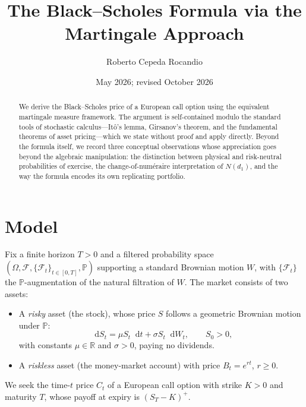 \documentclass[11pt,a4paper]{article}
\title{The Black--Scholes Formula via the Martingale Approach}
\author{Roberto Cepeda Rocandio}
\date{May 2026; revised October 2026}
\theoremstyle{plain}
\theoremstyle{definition}
\theoremstyle{remark}
\newcommand{\R}{\mathbb{R}}
\newcommand{\F}{\mathcal{F}}
\newcommand{\Prob}{\mathbb{P}}
\newcommand{\dd}{\mathop{}\!\mathrm{d}}
\begin{document}
\maketitle

\begin{abstract}
We derive the Black--Scholes price of a European call option using the
equivalent martingale measure framework. The argument is self-contained
modulo the standard tools of stochastic calculus---It\^{o}'s lemma,
Girsanov's theorem, and the fundamental theorems of asset pricing---which
we state without proof and apply directly. Beyond the formula itself,
we record three conceptual observations whose appreciation goes beyond
the algebraic manipulation: the distinction between physical and risk-neutral
probabilities of exercise, the change-of-num\'{e}raire interpretation
of \(N(d_1)\), and the way the formula encodes its own replicating
portfolio.
\end{abstract}

\section{Model}

Fix a finite horizon \(T > 0\) and a filtered probability space
\((\Omega, \F, \{\F_t\}_{t \in [0,T]}, \Prob)\) supporting a standard
Brownian motion \(W\), with \(\{\F_t\}\) the \(\Prob\)-augmentation of
the natural filtration of \(W\). The market consists of two assets:

\begin{itemize}
    \item A \emph{risky} asset (the stock), whose price \(S\) follows a
    geometric Brownian motion under \(\Prob\):
    \begin{equation}
        \dd S_t = \mu S_t \dd t + \sigma S_t \dd W_t,
        \qquad S_0 > 0,
        \label{eq:gbm-P}
    \end{equation}
    with constants \(\mu \in \R\) and \(\sigma > 0\), paying no dividends.
    \item A \emph{riskless} asset (the money-market account) with price
    \(B_t = e^{rt}\), \(r \geq 0\).
\end{itemize}

We seek the time-\(t\) price \(C_t\) of a European call option with strike
\(K > 0\) and maturity \(T\), whose payoff at expiry is \((S_T - K)^+\).
\end{document}
